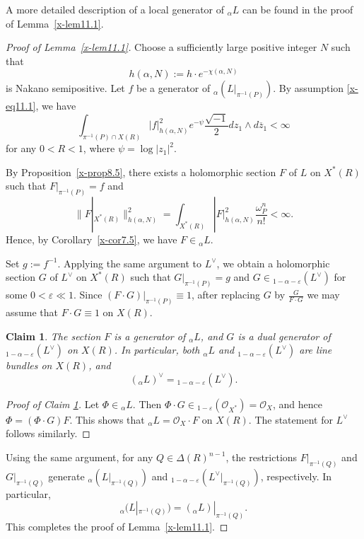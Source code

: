 \documentclass[12pt,twoside]{amsart}
\newtheorem{claim}[thm]{Claim}
\theoremstyle{definition}
\begin{document}
A more detailed description of a local generator of ${}_\alpha L$ can be found
in the proof of Lemma~\ref{x-lem11.1}.

\begin{proof}[Proof of Lemma~\ref{x-lem11.1}]
Choose a sufficiently large positive integer $N$ such that
\[
h(\alpha,N):=h\cdot e^{-\chi(\alpha,N)}
\]
is Nakano semipositive.
Let $f$ be a generator of ${}_\alpha\!\left(L|_{\pi^{-1}(P)}\right)$.
By assumption \eqref{x-eq11.1}, we have
\[
\int_{\pi^{-1}(P)\cap X(R)} |f|^2_{h(\alpha,N)} e^{-\psi}
\frac{\sqrt{-1}}{2}dz_1\wedge d\overline z_1 < \infty
\]
for any $0<R<1$, where $\psi=\log|z_1|^2$.

By Proposition~\ref{x-prop8.5}, there exists a holomorphic section $F$ of $L$ on
$X^*(R)$ such that $F|_{\pi^{-1}(P)}=f$ and
\[
\|F|_{X^*(R)}\|^2_{h(\alpha, N)}=\int_{X^*(R)} |F|^2_{h(\alpha,N)}\frac{\omega_P^n}{n!} < \infty.
\]
Hence, by Corollary~\ref{x-cor7.5}, we have $F\in {}_\alpha L$.

Set $g:=f^{-1}$.
Applying the same argument to $L^\vee$, we obtain a holomorphic section $G$ of
$L^\vee$ on $X^*(R)$ such that $G|_{\pi^{-1}(P)}=g$ and
$G\in {}_{1-\alpha-\varepsilon}(L^\vee)$ for some $0<\varepsilon\ll1$.
Since $(F\cdot G)|_{\pi^{-1}(P)}\equiv1$, after replacing $G$ by
$\frac{G}{F\cdot G}$ we may assume that $F\cdot G\equiv1$ on $X(R)$.

\begin{claim}\label{x-claim11.2}
The section $F$ is a generator of ${}_\alpha L$, and $G$ is a dual generator of
${}_{1-\alpha-\varepsilon}(L^\vee)$ on $X(R)$.
In particular, both ${}_\alpha L$ and ${}_{1-\alpha-\varepsilon}(L^\vee)$ are line
bundles on $X(R)$, and
\[
({}_\alpha L)^\vee = {}_{1-\alpha-\varepsilon}(L^\vee).
\]
\end{claim}

\begin{proof}[Proof of Claim \ref{x-claim11.2}]
Let $\Phi\in {}_\alpha L$.
Then $\Phi\cdot G\in {}_{1-\varepsilon}\left(\mathcal O_{X^*}\right)=\mathcal O_X$, and hence
$\Phi=(\Phi\cdot G)F$.
This shows that ${}_\alpha L=\mathcal O_X\cdot F$ on $X(R)$.
The statement for $L^\vee$ follows similarly.
\end{proof}

Using the same argument, for any $Q\in \Delta(R)^{n-1}$,
the restrictions $F|_{\pi^{-1}(Q)}$ and $G|_{\pi^{-1}(Q)}$ generate
${}_\alpha(L|_{\pi^{-1}(Q)})$ and
${}_{1-\alpha-\varepsilon}(L^\vee|_{\pi^{-1}(Q)})$, respectively.
In particular,
\[
{}_\alpha(L|_{\pi^{-1}(Q)}) = ({}_\alpha L)|_{\pi^{-1}(Q)}.
\]
This completes the proof of Lemma~\ref{x-lem11.1}.
\end{proof}
\end{document}
